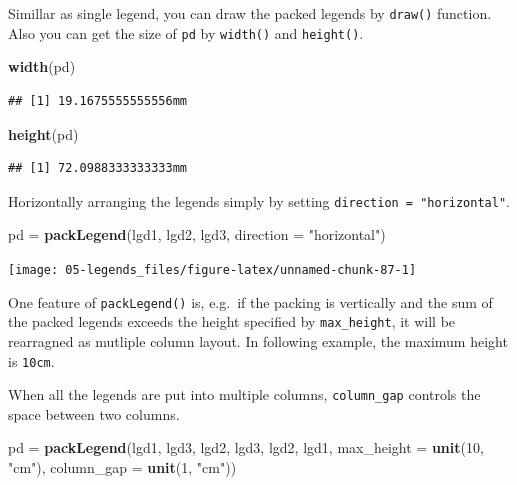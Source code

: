 \documentclass[]{book}
\newenvironment{Shaded}{\begin{snugshade}}{\end{snugshade}}
\newcommand{\KeywordTok}[1]{\textcolor[rgb]{0.13,0.29,0.53}{\textbf{#1}}}
\newcommand{\DataTypeTok}[1]{\textcolor[rgb]{0.13,0.29,0.53}{#1}}
\newcommand{\DecValTok}[1]{\textcolor[rgb]{0.00,0.00,0.81}{#1}}
\newcommand{\StringTok}[1]{\textcolor[rgb]{0.31,0.60,0.02}{#1}}
\newcommand{\NormalTok}[1]{#1}
\theoremstyle{definition}
\theoremstyle{definition}
\theoremstyle{definition}
\theoremstyle{remark}
\begin{document}
Simillar as single legend, you can draw the packed legends by
\texttt{draw()} function. Also you can get the size of \texttt{pd} by
\texttt{width()} and \texttt{height()}.

\begin{Shaded}
\begin{Highlighting}[]
\KeywordTok{width}\NormalTok{(pd)}
\end{Highlighting}
\end{Shaded}

\begin{verbatim}
## [1] 19.1675555555556mm
\end{verbatim}

\begin{Shaded}
\begin{Highlighting}[]
\KeywordTok{height}\NormalTok{(pd)}
\end{Highlighting}
\end{Shaded}

\begin{verbatim}
## [1] 72.0988333333333mm
\end{verbatim}

Horizontally arranging the legends simply by setting
\texttt{direction\ =\ "horizontal"}.

\begin{Shaded}
\begin{Highlighting}[]
\NormalTok{pd =}\StringTok{ }\KeywordTok{packLegend}\NormalTok{(lgd1, lgd2, lgd3, }\DataTypeTok{direction =} \StringTok{"horizontal"}\NormalTok{)}
\end{Highlighting}
\end{Shaded}

\begin{center}\texttt{[image: 05-legends\_files/figure-latex/unnamed-chunk-87-1]} \end{center}

One feature of \texttt{packLegend()} is, e.g.~if the packing is
vertically and the sum of the packed legends exceeds the height
specified by \texttt{max\_height}, it will be rearragned as mutliple
column layout. In following example, the maximum height is
\texttt{10cm}.

When all the legends are put into multiple columns, \texttt{column\_gap}
controls the space between two columns.

\begin{Shaded}
\begin{Highlighting}[]
\NormalTok{pd =}\StringTok{ }\KeywordTok{packLegend}\NormalTok{(lgd1, lgd3, lgd2, lgd3, lgd2, lgd1, }\DataTypeTok{max_height =} \KeywordTok{unit}\NormalTok{(}\DecValTok{10}\NormalTok{, }\StringTok{"cm"}\NormalTok{), }
    \DataTypeTok{column_gap =} \KeywordTok{unit}\NormalTok{(}\DecValTok{1}\NormalTok{, }\StringTok{"cm"}\NormalTok{))}
\end{Highlighting}
\end{Shaded}
\end{document}
